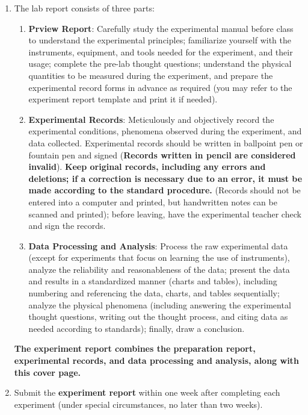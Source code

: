 \begin{enumerate}
	\item The lab report consists of three parts:
	\begin{enumerate}
		\item \textbf{Prview Report}: Carefully study the experimental manual before class to understand the experimental principles; familiarize yourself with the instruments, equipment, and tools needed for the experiment, and their usage; complete the pre-lab thought questions; understand the physical quantities to be measured during the experiment, and prepare the experimental record forms in advance as required (you may refer to the experiment report template and print it if needed).
		\item \textbf{Experimental Records}: Meticulously and objectively record the experimental conditions, phenomena observed during the experiment, and data collected. Experimental records should be written in ballpoint pen or fountain pen and signed (\textcolor{fred}{\textbf{Records written in pencil are considered invalid}}). \textcolor{fred}{\textbf{Keep original records, including any errors and deletions; if a correction is necessary due to an error, it must be made according to the standard procedure.}} (Records should not be entered into a computer and printed, but handwritten notes can be scanned and printed); before leaving, have the experimental teacher check and sign the records. 
		\item \textbf{Data Processing and Analysis}: Process the raw experimental data (except for experiments that focus on learning the use of instruments), analyze the reliability and reasonableness of the data; present the data and results in a standardized manner (charts and tables), including numbering and referencing the data, charts, and tables sequentially; analyze the physical phenomena (including answering the experimental thought questions, writing out the thought process, and citing data as needed according to standards); finally, draw a conclusion.
	\end{enumerate}
	\textbf{The experiment report combines the preparation report, experimental records, and data processing and analysis, along with this cover page.}
	\item Submit the \textbf{experiment report} within one week after completing each experiment (under special circumstances, no later than two weeks).
\end{enumerate}


	
